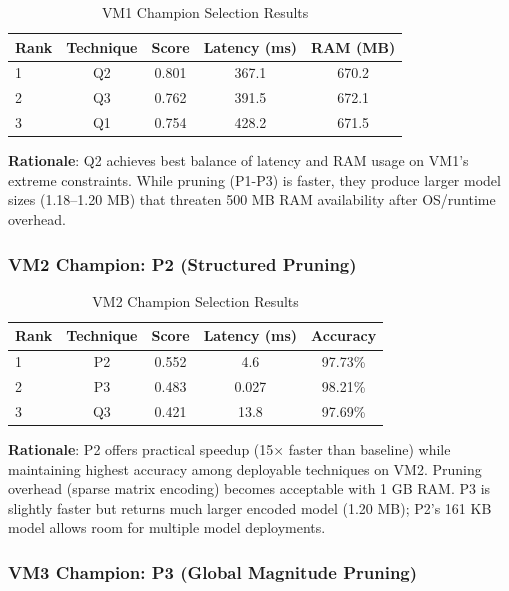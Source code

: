 \documentclass[12pt, a4paper]{article}
\begin{document}
\begin{table}[H]
\centering
\caption{VM1 Champion Selection Results}
\begin{tabular}{lcccc}
\toprule
\textbf{Rank} & \textbf{Technique} & \textbf{Score} & \textbf{Latency (ms)} & \textbf{RAM (MB)} \\
\midrule
1 & Q2 & 0.801 & 367.1 & 670.2 \\
2 & Q3 & 0.762 & 391.5 & 672.1 \\
3 & Q1 & 0.754 & 428.2 & 671.5 \\
\bottomrule
\end{tabular}
\label{tab:vm1_selection}
\end{table}

\textbf{Rationale}: Q2 achieves best balance of latency and RAM usage on VM1's extreme constraints. While pruning (P1-P3) is faster, they produce larger model sizes (1.18–1.20 MB) that threaten 500 MB RAM availability after OS/runtime overhead.

\subsubsection{VM2 Champion: P2 (Structured Pruning)}

\begin{table}[H]
\centering
\caption{VM2 Champion Selection Results}
\begin{tabular}{lcccc}
\toprule
\textbf{Rank} & \textbf{Technique} & \textbf{Score} & \textbf{Latency (ms)} & \textbf{Accuracy} \\
\midrule
1 & P2 & 0.552 & 4.6 & 97.73\% \\
2 & P3 & 0.483 & 0.027 & 98.21\% \\
3 & Q3 & 0.421 & 13.8 & 97.69\% \\
\bottomrule
\end{tabular}
\label{tab:vm2_selection}
\end{table}

\textbf{Rationale}: P2 offers practical speedup (15× faster than baseline) while maintaining highest accuracy among deployable techniques on VM2. Pruning overhead (sparse matrix encoding) becomes acceptable with 1 GB RAM. P3 is slightly faster but returns much larger encoded model (1.20 MB); P2's 161 KB model allows room for multiple model deployments.

\subsubsection{VM3 Champion: P3 (Global Magnitude Pruning)}
\end{document}
